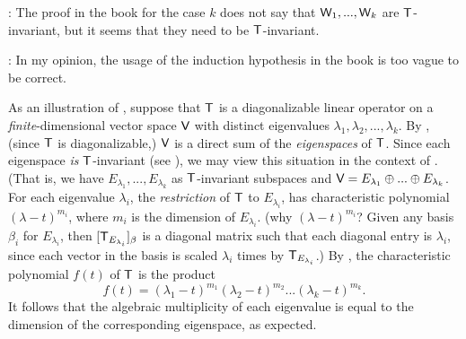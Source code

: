 \begin{note}
\RED{*}: The proof in the book for the case \(k\) does not say that \(\textsf{W}_1, ..., \textsf{W}_k\) are \(\textsf{T}\)-invariant, but it seems that they need to be \(\textsf{T}\)-invariant.

\RED{**}: In my opinion, the usage of the induction hypothesis in the book is too vague to be correct.
\end{note}

\begin{remark} \label{remark 5.4.4}
As an illustration of , suppose that \(\textsf{T}\) is a diagonalizable linear operator on a \emph{finite}-dimensional vector space \(\textsf{V}\) with distinct eigenvalues \(\lambda_1, \lambda_2, ..., \lambda_k\).
By , (since \(\textsf{T}\) is diagonalizable,) \(\textsf{V}\) is a direct sum of the \emph{eigenspaces} of \(\textsf{T}\).
Since each eigenspace \emph{is} \(\textsf{T}\)-invariant (see ), we may view this situation in the context of .
(That is, we have \(E_{\lambda_1}, ..., E_{\lambda_k}\) as \(\textsf{T}\)-invariant subspaces and \(\textsf{V} = E_{\lambda_1} \oplus ... \oplus E_{\lambda_k}\).
For each eigenvalue \(\lambda_i\), the \emph{restriction} of \(\textsf{T}\) to \(E_{\lambda_i}\), has characteristic polynomial \((\lambda - t)^{m_i}\), where \(m_i\) is the dimension of \(E_{\lambda_i}\).
(why \((\lambda - t)^{m_i}\)? Given any basis \(\beta_i\) for \(E_{\lambda_i}\), then \([\textsf{T}_{E_{\lambda_i}}]_{\beta}\) is a diagonal matrix such that each diagonal entry is \(\lambda_i\), since each vector in the basis is scaled \(\lambda_i\) times by \(\textsf{T}_{E_{\lambda_i}}\).)
By , the characteristic polynomial \(f(t)\) of \(\textsf{T}\) is the product
\[
    f(t) = (\lambda_1 - t)^{m_1} (\lambda_2 - t)^{m_2} ... (\lambda_k - t)^{m_k}.
\]
It follows that the algebraic multiplicity of each eigenvalue is equal to the dimension of the corresponding eigenspace, as expected.
\end{remark}

